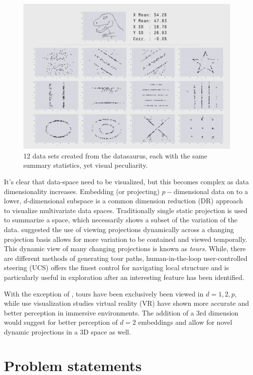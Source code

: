 \documentclass{monashthesis}
\begin{document}
\begin{figure}

{\centering \includegraphics[width=0.7\linewidth]{./figures/matejka17fig} 

}

\caption{12 data sets created from the datasaurus, each
with the same summary statistics, yet visual peculiarity.}\label{fig:matejka17fig}
\end{figure}

It's clear that data-space need to be visualized, but this becomes
complex as data dimensionality increases. Embedding (or projecting)
\(p-\)dimensional data on to a lower, \(d\)-dimensional subspace is a
common dimension reduction (DR) approach to visualize multivariate data
spaces. Traditionally single static projection is used to summarize a
space, which necessarily shows a subset of the variation of the data.
\textcite{asimov_grand_1985} suggested the use of viewing projections
dynamically across a changing projection basis allows for more variation
to be contained and viewed temporally. This dynamic view of many
changing projections is known as \emph{tours}. While, there are
different methods of generating tour paths, human-in-the-loop
user-controlled steering (UCS) offers the finest control for navigating
local structure and is particularly useful in exploration after an
interesting feature has been identified.

With the exception of \textcite{nelson_xgobi_1998}, tours have been
exclusively been viewed in \(d={1, 2, p}\), while use visualization
studies virtual reality (VR) have shown more accurate and better
perception in immersive environments. The addition of a 3rd dimension
would suggest for better perception of \(d=2\) embeddings and allow for
novel dynamic projections in a 3D space as well.

\section{Problem statements}\label{problem-statements}
\end{document}
